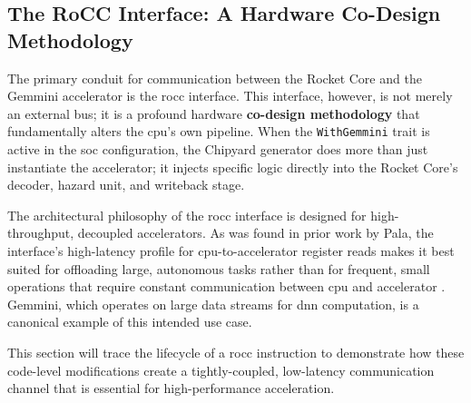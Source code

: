 
\subsection{The RoCC Interface: A Hardware Co-Design Methodology}
\label{subsec:rocc_interface}

The primary conduit for communication between the Rocket Core and the Gemmini accelerator is the \acrfull{rocc} interface. This interface, however, is not merely an external bus; it is a profound hardware \textbf{co-design methodology} that fundamentally alters the \acrshort{cpu}'s own pipeline. When the \texttt{WithGemmini} trait is active in the \acrshort{soc} configuration, the Chipyard generator does more than just instantiate the accelerator; it injects specific logic directly into the Rocket Core's decoder, hazard unit, and writeback stage.

The architectural philosophy of the \acrshort{rocc} interface is designed for high-throughput, decoupled accelerators. As was found in prior work by Pala, the interface's high-latency profile for \acrshort{cpu}-to-accelerator register reads makes it best suited for offloading large, autonomous tasks rather than for frequent, small operations that require constant communication between \acrshort{cpu} and accelerator \cite{pala_master_thesis}. Gemmini, which operates on large data streams for \acrshort{dnn} computation, is a canonical example of this intended use case.

This section will trace the lifecycle of a \acrshort{rocc} instruction to demonstrate how these code-level modifications create a tightly-coupled, low-latency communication channel that is essential for high-performance acceleration.

